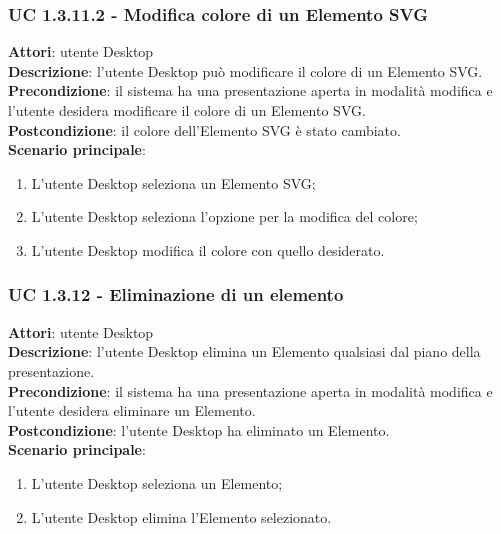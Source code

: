 \subsubsection{UC 1.3.11.2 - Modifica colore di un Elemento SVG}{
	\label{uc1.3.11.2}
	\textbf{Attori}: utente Desktop \\
	\textbf{Descrizione}: l'utente Desktop può modificare il colore di un Elemento SVG. \\
	\textbf{Precondizione}: il sistema ha una presentazione aperta in modalità modifica e l'utente desidera modificare il colore di un Elemento SVG.	\\
	\textbf{Postcondizione}: il colore dell'Elemento SVG è stato cambiato.	\\
	\textbf{Scenario principale}:
	\begin{enumerate}
		\item L'utente Desktop seleziona un Elemento SVG;
		\item L'utente Desktop seleziona l'opzione per la modifica del colore;
		\item L'utente Desktop modifica il colore con quello desiderato.
	\end{enumerate}
	}
\subsubsection{UC 1.3.12 - Eliminazione di un elemento}{
		\label{uc1.3.12}
		\textbf{Attori}: utente Desktop \\
		\textbf{Descrizione}: l'utente Desktop elimina un Elemento qualsiasi dal piano della presentazione. \\
		\textbf{Precondizione}: il sistema ha una presentazione aperta in modalità modifica e l'utente desidera eliminare un Elemento.	\\
		\textbf{Postcondizione}: l'utente Desktop ha eliminato un Elemento.	\\
		\textbf{Scenario principale}:
		\begin{enumerate}
			\item L'utente Desktop seleziona un Elemento;
			\item L'utente Desktop elimina l'Elemento selezionato.
		\end{enumerate}
		}
